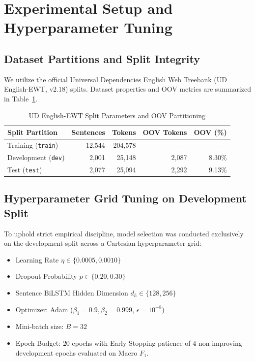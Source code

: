 \documentclass[conference]{IEEEtran}
\begin{document}
\section{Experimental Setup and Hyperparameter Tuning}
\label{sec:experiments}

\subsection{Dataset Partitions and Split Integrity}
We utilize the official Universal Dependencies English Web Treebank (UD English-EWT, v2.18) splits. Dataset properties and OOV metrics are summarized in Table~\ref{tab:splits_phase2}.

\begin{table}[htbp]
\caption{UD English-EWT Split Parameters and OOV Partitioning}
\label{tab:splits_phase2}
\centering
\small
\setlength{\tabcolsep}{4pt}
\begin{tabular}{lrrrr}
\toprule
\textbf{Split Partition} & \textbf{Sentences} & \textbf{Tokens} & \textbf{OOV Tokens} & \textbf{OOV (\%)} \\
\midrule
Training (\texttt{train})     & 12,544 & 204,578 & ---   & --- \\
Development (\texttt{dev})    &  2,001 &  25,148 & 2,087 & 8.30\% \\
Test (\texttt{test})          &  2,077 &  25,094 & 2,292 & 9.13\% \\
\bottomrule
\end{tabular}
\end{table}

\subsection{Hyperparameter Grid Tuning on Development Split}
To uphold strict empirical discipline, model selection was conducted exclusively on the development split across a Cartesian hyperparameter grid:
\begin{itemize}
    \item Learning Rate $\eta \in \{0.0005, 0.0010\}$
    \item Dropout Probability $p \in \{0.20, 0.30\}$
    \item Sentence BiLSTM Hidden Dimension $d_h \in \{128, 256\}$
    \item Optimizer: Adam ($\beta_1 = 0.9, \beta_2 = 0.999$, $\epsilon = 10^{-8}$)
    \item Mini-batch size: $B = 32$
    \item Epoch Budget: $20$ epochs with Early Stopping patience of $4$ non-improving development epochs evaluated on Macro $F_1$.
\end{itemize}
\end{document}
